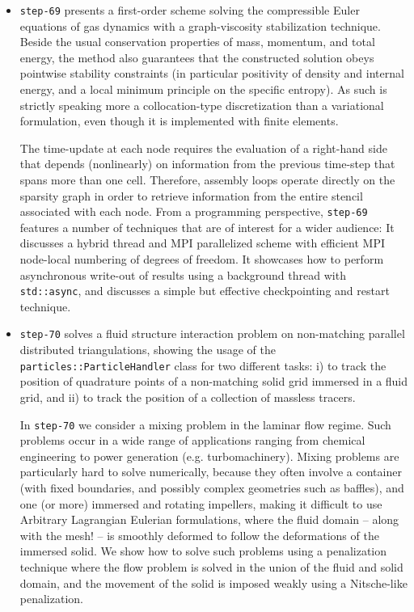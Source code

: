 \documentclass{ansarticle-preprint}
\begin{document}
\begin{itemize}
  \item \texttt{step-69} presents a first-order scheme solving the compressible
        Euler equations of gas dynamics with a graph-viscosity stabilization
        technique. Beside the usual conservation properties of mass, momentum, and
        total energy, the method also guarantees that the constructed solution
        obeys pointwise stability constraints (in particular positivity of
        density and internal
        energy, and a local minimum principle on the specific entropy). As such
         is strictly speaking more a collocation-type discretization
        than a variational formulation, even though it is implemented with finite
        elements.

        The time-update at each node requires the evaluation of a right-hand side
        that depends (nonlinearly) on information from the previous time-step that
        spans more than one cell. Therefore, assembly loops operate directly on the
        sparsity graph in order to retrieve information from the entire stencil
        associated with each node. From a programming perspective, \texttt{step-69}
        features a number of techniques that are of interest for a wider audience:
        It discusses a hybrid thread and MPI parallelized scheme with efficient
        MPI node-local numbering of degrees of freedom. It showcases how to
        perform asynchronous write-out of results using a background thread with
        \texttt{std::async}, and discusses a simple but effective checkpointing and
        restart technique.

  \item \texttt{step-70} solves a fluid structure interaction problem on
        non-matching parallel distributed triangulations, showing the usage of
        the \texttt{particles::ParticleHandler} class for two different tasks:
        i) to track the position of quadrature points of a non-matching
        solid grid immersed in a fluid grid, and ii) to track the position of a
        collection of massless tracers.

        In \texttt{step-70} we consider a mixing problem in the laminar flow
        regime. Such problems occur in a wide range of applications ranging
        from chemical engineering to power generation (e.g. turbomachinery).
        Mixing problems are particularly hard to solve numerically, because
        they often involve a container (with fixed boundaries, and possibly
        complex geometries such as baffles), and one (or more) immersed and
        rotating impellers, making it difficult to use Arbitrary Lagrangian
        Eulerian formulations, where the fluid domain – along with the mesh! –
        is smoothly deformed to follow the deformations of the immersed solid.
        We show how to solve such problems using a penalization technique
        where the flow problem is solved in the union of the fluid and solid
        domain, and the movement of the solid is imposed weakly using a
        Nitsche-like penalization.


\end{itemize}
\end{document}
